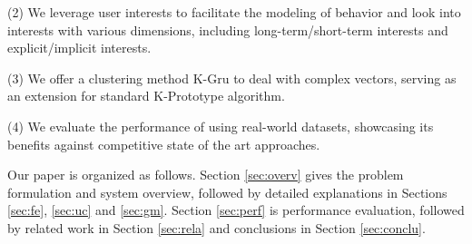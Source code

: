 \stab(2) We leverage user interests to facilitate the modeling of \retg{} behavior and look into interests with various dimensions, including long-term/short-term interests and explicit/implicit interests.

\stab(3) We offer a clustering method K-Gru to deal with complex vectors, serving as an extension for standard K-Prototype algorithm.

\stab(4) We evaluate the performance of \sys{} using real-world datasets, showcasing its benefits against competitive state of the art approaches.



Our paper is organized as follows.
Section \ref{sec:overv} gives the problem formulation and system overview, followed by detailed explanations in Sections \ref{sec:fe}, \ref{sec:uc} and \ref{sec:gm}.
Section \ref{sec:perf} is performance evaluation, followed by
related work in Section \ref{sec:rela} and conclusions in Section \ref{sec:conclu}.











